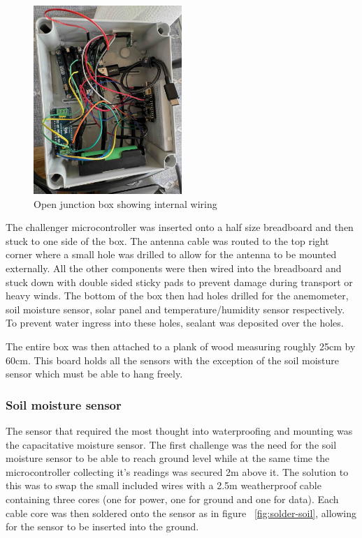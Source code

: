 \begin{figure}[H]
    \centering
    \includegraphics[width=0.5\textwidth]{contents/23-hw-development/23-fig/box-internals.jpeg}
    \caption{Open junction box showing internal wiring}
    \label{fig:box-internals}
\end{figure}

The challenger microcontroller was inserted onto a half size breadboard and then
stuck to one side of the box. The antenna cable was routed to the top right
corner where a small hole was drilled to allow for the antenna to be mounted
externally. All the other components were then wired into the breadboard and
stuck down with double sided sticky pads to prevent damage during transport or
heavy winds. The bottom of the box then had holes drilled for the anemometer,
soil moisture sensor, solar panel and temperature/humidity sensor respectively.
To prevent water ingress into these holes, sealant was deposited over the holes.

The entire box was then attached to a plank of wood measuring roughly 25cm by
60cm. This board holds all the sensors with the exception of the soil moisture
sensor which must be able to hang freely.

\subsubsection{Soil moisture sensor}

The sensor that required the most thought into waterproofing and mounting was
the capacitative moisture sensor. The first challenge was the need for the soil
moisture sensor to be able to reach ground level while at the same time the
microcontroller collecting it's readings was secured 2m above it. The solution
to this was to swap the small included wires with a 2.5m weatherproof cable
containing three cores (one for power, one for ground and one for data). Each
cable core was then soldered onto the sensor as in figure
~\ref{fig:solder-soil}, allowing for the sensor to be inserted into the ground.


